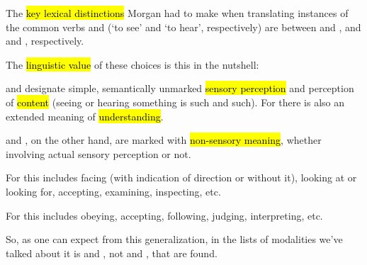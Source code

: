 \begin{paper}
	{\click} The \hl{key lexical distinctions} Morgan had to make when translating instances of the common verbs  and  (‘to see’ and ‘to hear’, respectively) are between  and , and  and , respectively.

	{\click} The \hl{linguistic value} of these choices is this in the nutshell:
	\begin{compactitem}
		\item {} and  designate simple, semantically unmarked \hl{sensory perception} and perception of \hl{content} (seeing or hearing something is such and such). For  there is also an extended meaning of \hl{understanding}.
		\item {} and , on the other hand, are marked with \hl{non-sensory meaning}, whether involving actual sensory perception or not.
			\begin{compactitem}
				\item For  this includes facing (with indication of direction or without it), looking at or looking for, accepting, examining, inspecting, etc.
				\item For  this includes obeying, accepting, following, judging, interpreting, etc.
			\end{compactitem}
	\end{compactitem}

	So, as one can expect from this generalization, in the lists of modalities we’ve talked about it is  and , not  and , that are found.
\end{paper}



